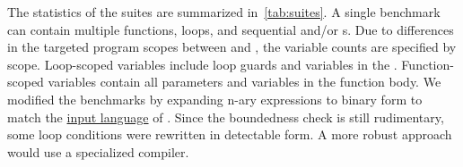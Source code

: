 The statistics of the suites are summarized in~\autoref{tab:suites}. A single
benchmark can contain multiple functions, loops, and sequential and/or
s. Due to differences in the targeted program scopes between
\ndx{\impl} and \ndx{\impf}, the variable counts are specified by scope.
Loop-scoped variables include loop guards and variables in
the . Function-scoped variables contain all parameters and
variables in the function body. We modified the benchmarks by expanding n-ary
expressions to binary form to match the
\href{https://statycc.github.io/pymwp/features/}{input language} of .
Since the boundedness check is still rudimentary, some loop conditions were
rewritten in detectable form. A more robust approach would use a specialized
compiler.
